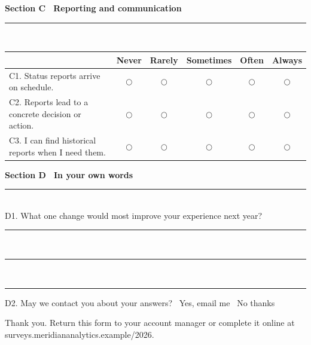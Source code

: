 \documentclass[10pt]{article}
\newcommand{\cb}{\raisebox{-1pt}{\large$\square$}\ }
\newcommand{\lik}{$\bigcirc$}
\newcommand{\sectionhead}[1]{%
  \vspace{12pt}
  {\large\bfseries\color{accent}#1}\\[-4pt]
  {\color{accent}\rule{\linewidth}{1pt}}\\[6pt]}
\begin{document}
\sectionhead{Section C \, Reporting and communication}

\begin{tabularx}{\textwidth}{@{}XCCCCC@{}}
  \toprule
  & {\scriptsize\bfseries Never} & {\scriptsize\bfseries Rarely}
  & {\scriptsize\bfseries Sometimes} & {\scriptsize\bfseries Often}
  & {\scriptsize\bfseries Always}\\
  \midrule
  C1. Status reports arrive on schedule. & \lik & \lik & \lik & \lik & \lik\\
  C2. Reports lead to a concrete decision or action. & \lik & \lik & \lik & \lik & \lik\\
  C3. I can find historical reports when I need them. & \lik & \lik & \lik & \lik & \lik\\
  \bottomrule
\end{tabularx}

\sectionhead{Section D \, In your own words}

D1. What one change would most improve your experience next year?

\vspace{4pt}
\rule{\linewidth}{0.4pt}\\[10pt]
\rule{\linewidth}{0.4pt}\\[10pt]
\rule{\linewidth}{0.4pt}

\vspace{10pt}
D2. May we contact you about your answers? \quad
\cb Yes, email me \quad \cb No thanks

\vspace{12pt}
{\color{inkgray}\small Thank you. Return this form to your account manager
or complete it online at surveys.meridiananalytics.example/2026.}
\end{document}
